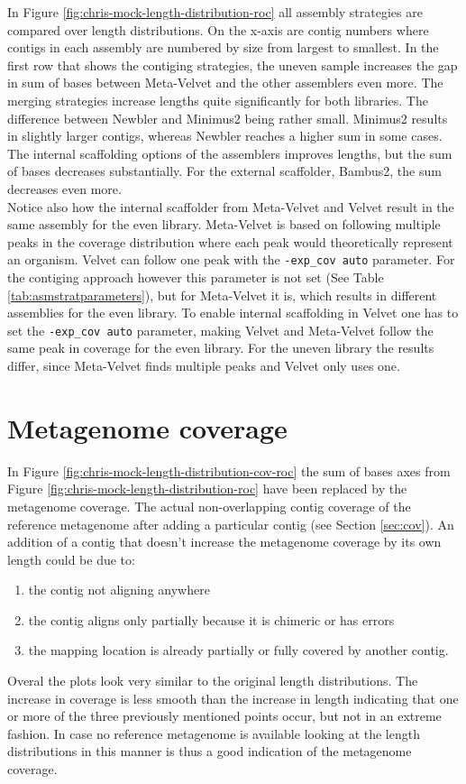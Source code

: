 \documentclass[a4paper,12pt]{report}
\begin{document}
In Figure \ref{fig:chris-mock-length-distribution-roc} all assembly strategies
are compared over length distributions. On the x-axis are contig numbers where
contigs in each assembly are numbered by size from largest to smallest. In the
first row that shows the contiging strategies, the uneven sample increases the
gap in sum of bases between Meta-Velvet and the other assemblers even more. The
merging strategies increase lengths quite significantly for both libraries. The
difference between Newbler and Minimus2 being rather small. Minimus2 results in
slightly larger contigs, whereas Newbler reaches a higher sum in some cases.
The internal scaffolding options of the assemblers improves lengths, but the
sum of bases decreases substantially.  For the external scaffolder, Bambus2,
the sum decreases even more.\\


Notice also how the internal scaffolder from Meta-Velvet and Velvet result in
the same assembly for the even library. Meta-Velvet is based on following
multiple peaks in the coverage distribution where each peak would theoretically
represent an organism. Velvet can follow one peak with the \verb!-exp_cov auto!
parameter. For the contiging approach however this parameter is not set (See
Table \ref{tab:asmstratparameters}), but for Meta-Velvet it is, which results
in different assemblies for the even library.  To enable internal scaffolding
in Velvet one has to set the \verb!-exp_cov auto!  parameter, making Velvet and
Meta-Velvet follow the same peak in coverage for the even library. For the
uneven library the results differ, since Meta-Velvet finds multiple peaks and
Velvet only uses one. 


\section{Metagenome coverage}
In Figure \ref{fig:chris-mock-length-distribution-cov-roc} the sum of bases
axes from Figure \ref{fig:chris-mock-length-distribution-roc} have been
replaced by the metagenome coverage. The actual non-overlapping contig coverage
of the reference metagenome after adding a particular contig (see Section
\ref{sec:cov}).  An addition of a contig that doesn't increase the metagenome
coverage by its own length could be due to:
\begin{enumerate}
\item\label{en:aln} the contig not aligning anywhere
\item\label{en:chi} the contig aligns only partially because it is chimeric or has errors
\item\label{en:dup} the mapping location is already partially or fully covered by another
contig.
\end{enumerate}
Overal the plots look very similar to the original length distributions.  The
increase in coverage is less smooth than the increase in length indicating that
one or more of the three previously mentioned points occur, but not in an
extreme fashion. In case no reference metagenome is available looking at the
length distributions in this manner is thus a good indication of the metagenome
coverage.\\
\end{document}
